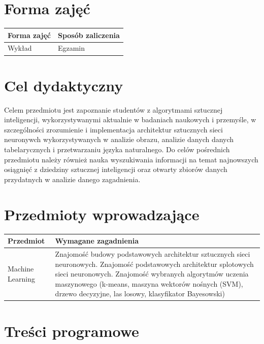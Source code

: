 \documentclass[12pt, a4paper]{article}
\begin{document}
\section{Forma zajęć}

\begin{tabular}{ll}
  \hline
  \textbf{Forma zajęć} & \textbf{Sposób zaliczenia} \\
  \hline
  Wykład & Egzamin \\
  \hline
\end{tabular}

\section{Cel dydaktyczny}

Celem przedmiotu jest zapoznanie studentów z algorytmami sztucznej inteligencji, wykorzystywanymi aktualnie w badaniach naukowych i przemyśle, w szczególności zrozumienie i implementacja architektur sztucznych sieci neuronywch wykorzystywanych w analizie obrazu, analizie danych danych tabelarycznych i przetwarzaniu języka naturalnego. Do celów pośrednich przedmiotu należy również nauka wyszukiwania informacji na temat najnowszych osiągnięć z dziedziny sztucznej inteligencji oraz otwarty zbiorów danych przydatnych w analizie danego zagadnienia.

\section{Przedmioty wprowadzające}

\begin{tabularx}{\textwidth}{lX}
  \hline
  \textbf{Przedmiot} & \textbf{Wymagane zagadnienia} \\
  \hline
  Machine Learning & Znajomość budowy podstawowych architektur sztucznych sieci neuronowych. Znajomość podstawowych architektur splotowych sieci neuronowych. Znajomość wybranych algorytmów uczenia maszynowego (k-means, maszyna wektorów nośnych (SVM), drzewo decyzyjne, las losowy, klasyfikator Bayesowski) \\
  \hline
\end{tabularx}

\section{Treści programowe}
\end{document}

